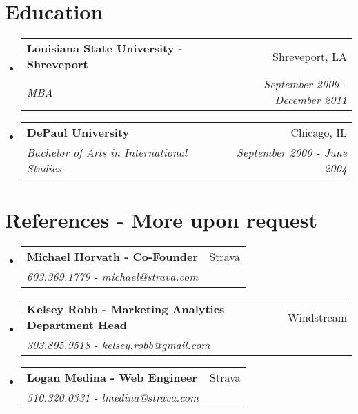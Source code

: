 \documentclass[letterpaper,11pt]{article}
\makeatletter
\newcommand{\resumeSubheading}[4]{
  \vspace{-2pt}\item
    \begin{tabular*}{0.97\textwidth}{l@{\extracolsep{\fill}}r}
      \textbf{#1} & #2 \\
      \textit{\small#3} & \textit{\small #4} \\
    \end{tabular*}\vspace{-5pt}
}
\newcommand{\resumeSubHeadingListStart}{\begin{itemize}[leftmargin=*]}
\newcommand{\resumeSubHeadingListEnd}{\end{itemize}}
\makeatother
\begin{document}
\section{Education}
  \resumeSubHeadingListStart
    \resumeSubheading
      {Louisiana State University - Shreveport}{Shreveport, LA}
      {MBA}{September 2009 - December 2011}
          \resumeSubheading
      {DePaul University}{Chicago, IL}
      {Bachelor of Arts in International Studies}{September 2000 - June 2004}
  \resumeSubHeadingListEnd
  
\section{References - More upon request}
  \resumeSubHeadingListStart
    \resumeSubheading
      {Michael Horvath - Co-Founder}{Strava}
      {603.369.1779 - michael@strava.com}{}
    \resumeSubheading
      {Kelsey Robb - Marketing Analytics Department Head}{Windstream}
      {303.895.9518 - kelsey.robb@gmail.com}{}
    \resumeSubheading
      {Logan Medina - Web Engineer}{Strava}
      {510.320.0331 - lmedina@strava.com}{}
  \resumeSubHeadingListEnd
  
\end{document}
